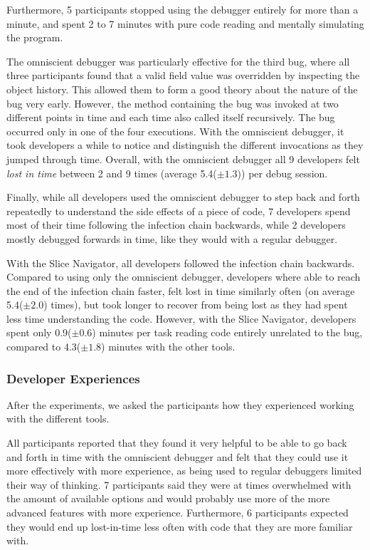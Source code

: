 Furthermore, 5 participants stopped using the debugger entirely for more than a minute, and spent 2 to 7 minutes with pure code reading and mentally simulating the program.

The omniscient debugger was particularly effective for the third bug, where all three participants found that a valid field value was overridden by inspecting the object history.
This allowed them to form a good theory about the nature of the bug very early.
However, the method containing the bug was invoked at two different points in time and each time also called itself recursively.
The bug occurred only in one of the four executions.
With the omniscient debugger, it took developers a while to notice and distinguish the different invocations as they jumped through time.
Overall, with the omniscient debugger all 9 developers felt \emph{lost in time} between 2 and 9 times (average 5.4($\pm1.3$)) per debug session.

Finally, while all developers used the omniscient debugger to step back and forth repeatedly to understand the side effects of a piece of code, 7 developers spend most of their time following the infection chain backwards, while 2 developers mostly debugged forwards in time, like they would with a regular debugger.

With the Slice Navigator, all developers followed the infection chain backwards.
Compared to using only the omniscient debugger, developers where able to reach the end of the infection chain faster, felt lost in time similarly often (on average 5.4($\pm2.0$) times), but took longer to recover from being lost as they had spent less time understanding the code.
However, with the Slice Navigator, developers spent only 0.9($\pm0.6$) minutes per task reading code entirely unrelated to the bug, compared to 4.3($\pm1.8$) minutes with the other tools.

\subsubsection{Developer Experiences}

After the experiments, we asked the participants how they experienced working with the different tools.

All participants reported that they found it very helpful to be able to go back and forth in time with the omniscient debugger and felt that they could use it more effectively with more experience, as being used to regular debuggers limited their way of thinking.
7 participants said they were at times overwhelmed with the amount of available options and would probably use more of the more advanced features with more experience.
Furthermore, 6 participants expected they would end up lost-in-time less often with code that they are more familiar with.


